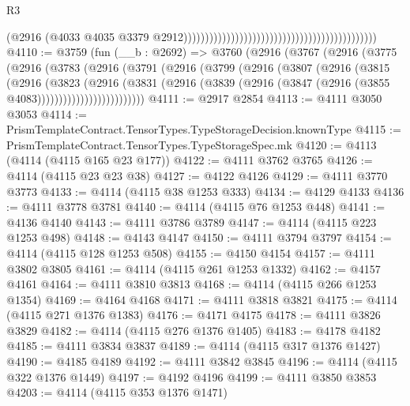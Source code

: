 \begin{lexlean}{R3}
\begin{coremodule}
                                                                                          (@2916
                                                                                            (@4033
                                                                                              @4035
                                                                                              @3379
                                                                                              @2912)))))))))))))))))))))))))))))))))))))))))))))
@4110 := @3759
    (fun (__b : @2692) =>
    @3760
      (@2916
        (@3767
          (@2916
            (@3775
              (@2916
                (@3783
                  (@2916
                    (@3791
                      (@2916
                        (@3799
                          (@2916
                            (@3807
                              (@2916
                                (@3815
                                  (@2916
                                    (@3823
                                      (@2916
                                        (@3831
                                          (@2916
                                            (@3839
                                              (@2916
                                                (@3847 (@2916 (@3855 @4083)))))))))))))))))))))))))
@4111 := @2917 @2854
@4113 := @4111 @3050 @3053
@4114 := PrismTemplateContract.TensorTypes.TypeStorageDecision.knownType
@4115 := PrismTemplateContract.TensorTypes.TypeStorageSpec.mk
@4120 := @4113 (@4114 (@4115 @165 @23 @177))
@4122 := @4111 @3762 @3765
@4126 := @4114 (@4115 @23 @23 @38)
@4127 := @4122 @4126
@4129 := @4111 @3770 @3773
@4133 := @4114 (@4115 @38 @1253 @333)
@4134 := @4129 @4133
@4136 := @4111 @3778 @3781
@4140 := @4114 (@4115 @76 @1253 @448)
@4141 := @4136 @4140
@4143 := @4111 @3786 @3789
@4147 := @4114 (@4115 @223 @1253 @498)
@4148 := @4143 @4147
@4150 := @4111 @3794 @3797
@4154 := @4114 (@4115 @128 @1253 @508)
@4155 := @4150 @4154
@4157 := @4111 @3802 @3805
@4161 := @4114 (@4115 @261 @1253 @1332)
@4162 := @4157 @4161
@4164 := @4111 @3810 @3813
@4168 := @4114 (@4115 @266 @1253 @1354)
@4169 := @4164 @4168
@4171 := @4111 @3818 @3821
@4175 := @4114 (@4115 @271 @1376 @1383)
@4176 := @4171 @4175
@4178 := @4111 @3826 @3829
@4182 := @4114 (@4115 @276 @1376 @1405)
@4183 := @4178 @4182
@4185 := @4111 @3834 @3837
@4189 := @4114 (@4115 @317 @1376 @1427)
@4190 := @4185 @4189
@4192 := @4111 @3842 @3845
@4196 := @4114 (@4115 @322 @1376 @1449)
@4197 := @4192 @4196
@4199 := @4111 @3850 @3853
@4203 := @4114 (@4115 @353 @1376 @1471)

\end{coremodule}
\end{lexlean}
